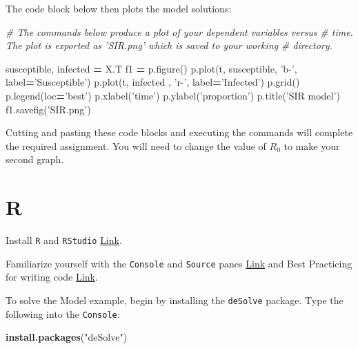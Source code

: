 \documentclass[]{book}
\newenvironment{Shaded}{\begin{snugshade}}{\end{snugshade}}
\newcommand{\KeywordTok}[1]{\textcolor[rgb]{0.13,0.29,0.53}{\textbf{{#1}}}}
\newcommand{\StringTok}[1]{\textcolor[rgb]{0.31,0.60,0.02}{{#1}}}
\newcommand{\CommentTok}[1]{\textcolor[rgb]{0.56,0.35,0.01}{\textit{{#1}}}}
\newcommand{\OperatorTok}[1]{\textcolor[rgb]{0.81,0.36,0.00}{\textbf{{#1}}}}
\newcommand{\NormalTok}[1]{{#1}}
\begin{document}
The code block below then plots the model solutions:

\begin{Shaded}
\begin{Highlighting}[]
\CommentTok{# The commands below produce a plot of your dependent variables versus}
\CommentTok{# time. The plot is exported as 'SIR.png' which is saved to your working}
\CommentTok{# directory.}

\NormalTok{susceptible, infected }\OperatorTok{=} \NormalTok{X.T}
\NormalTok{f1 }\OperatorTok{=} \NormalTok{p.figure()}
\NormalTok{p.plot(t, susceptible, }\StringTok{'b-'}\NormalTok{, label}\OperatorTok{=}\StringTok{'Susceptible'}\NormalTok{)}
\NormalTok{p.plot(t, infected  , }\StringTok{'r-'}\NormalTok{, label}\OperatorTok{=}\StringTok{'Infected'}\NormalTok{)}
\NormalTok{p.grid()}
\NormalTok{p.legend(loc}\OperatorTok{=}\StringTok{'best'}\NormalTok{)}
\NormalTok{p.xlabel(}\StringTok{'time'}\NormalTok{)}
\NormalTok{p.ylabel(}\StringTok{'proportion'}\NormalTok{)}
\NormalTok{p.title(}\StringTok{'SIR model'}\NormalTok{)}
\NormalTok{f1.savefig(}\StringTok{'SIR.png'}\NormalTok{)}
\end{Highlighting}
\end{Shaded}

Cutting and pasting these code blocks and executing the commands will
complete the required assignment. You will need to change the value of
\(R_0\) to make your second graph.

\section{R}\label{r}

Install \texttt{R} and \texttt{RStudio}
\href{https://ahurford.github.io/quant-guide-all-courses/install.html}{Link}.

Familiarize yourself with the \texttt{Console} and \texttt{Source} panes
\href{https://ahurford.github.io/quant-guide-all-courses/rstudio.html}{Link}
and Best Practicing for writing code
\href{https://ahurford.github.io/quant-guide-all-courses/style.html}{Link}.

To solve the Model example, begin by installing the \texttt{deSolve}
package. Type the following into the \texttt{Console}:

\begin{Shaded}
\begin{Highlighting}[]
\KeywordTok{install.packages}\NormalTok{(}\StringTok{"deSolve"}\NormalTok{)}
\end{Highlighting}
\end{Shaded}
\end{document}
